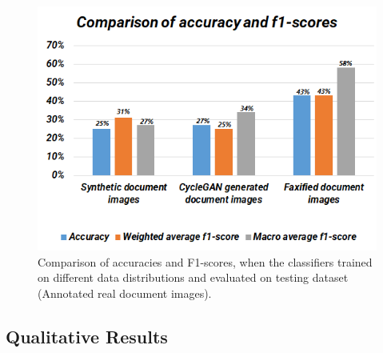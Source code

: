 \begin{figure}[H]
        \begin{center}
	    \includegraphics[scale=0.90]{images/Evaluation/ComparisonOfAccuracyAndF1Score.png}
	    \caption[Comparison of accuracies and F1-scores, when the classifiers trained on different data distributions and evaluated on testing dataset (Annotated real document images).]{Comparison of accuracies and F1-scores, when the classifiers trained on different data distributions and evaluated on testing dataset (Annotated real document images).}
	    \label{fig:ComparisonOfAccuracyAndF1Score}
	    \end{center}
\end{figure}


\subsection{Qualitative Results}\label{QualitativeResults}

